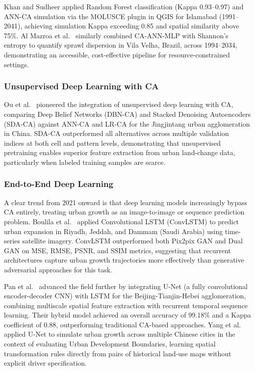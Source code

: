 \documentclass[12pt,a4paper]{article}
\begin{document}
Khan and Sudheer \cite{khan2022} applied Random Forest classification (Kappa 0.93--0.97) and ANN-CA simulation via the MOLUSCE plugin in QGIS for Islamabad (1991--2041), achieving simulation Kappa exceeding 0.85 and spatial similarity above 75\%. Al Mazroa et al.\ \cite{almazroa2024} similarly combined CA-ANN-MLP with Shannon's entropy to quantify sprawl dispersion in Vila Velha, Brazil, across 1994--2034, demonstrating an accessible, cost-effective pipeline for resource-constrained settings.

\subsubsection{Unsupervised Deep Learning with CA}
Ou et al.\ \cite{ou2019} pioneered the integration of unsupervised deep learning with CA, comparing Deep Belief Networks (DBN-CA) and Stacked Denoising Autoencoders (SDA-CA) against ANN-CA and LR-CA for the Jingjintang urban agglomeration in China. SDA-CA outperformed all alternatives across multiple validation indices at both cell and pattern levels, demonstrating that unsupervised pretraining enables superior feature extraction from urban land-change data, particularly when labeled training samples are scarce.

\subsubsection{End-to-End Deep Learning}
A clear trend from 2021 onward is that deep learning models increasingly bypass CA entirely, treating urban growth as an image-to-image or sequence prediction problem. Boulila et al.\ \cite{boulila2021} applied Convolutional LSTM (ConvLSTM) to predict urban expansion in Riyadh, Jeddah, and Dammam (Saudi Arabia) using time-series satellite imagery. ConvLSTM outperformed both Pix2pix GAN and Dual GAN on MSE, RMSE, PSNR, and SSIM metrics, suggesting that recurrent architectures capture urban growth trajectories more effectively than generative adversarial approaches for this task.

Pan et al.\ \cite{pan2022} advanced the field further by integrating U-Net (a fully convolutional encoder-decoder CNN) with LSTM for the Beijing-Tianjin-Hebei agglomeration, combining multiscale spatial feature extraction with recurrent temporal sequence learning. Their hybrid model achieved an overall accuracy of 99.18\% and a Kappa coefficient of 0.88, outperforming traditional CA-based approaches. Yang et al.\ \cite{yang2025} applied U-Net to simulate urban growth across multiple Chinese cities in the context of evaluating Urban Development Boundaries, learning spatial transformation rules directly from pairs of historical land-use maps without explicit driver specification.
\end{document}
